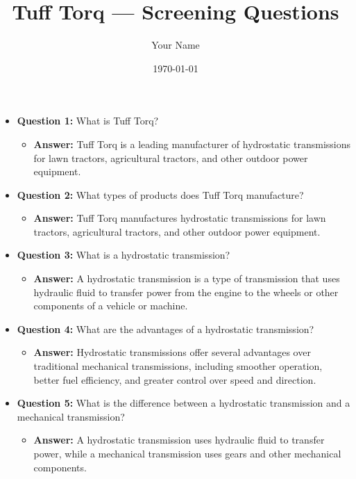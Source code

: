 \documentclass{article}
\begin{document}
\title{Tuff Torq --- Screening Questions}
\author{Your Name}
\date{\today}
\maketitle

\begin{itemize}
    \item \textbf{Question 1:} What is Tuff Torq?
    \begin{itemize}
        \item \textbf{Answer:} Tuff Torq is a leading manufacturer of hydrostatic transmissions for lawn tractors, agricultural tractors, and other outdoor power equipment.
    \end{itemize}
    
    \item \textbf{Question 2:} What types of products does Tuff Torq manufacture?
    \begin{itemize}
        \item \textbf{Answer:} Tuff Torq manufactures hydrostatic transmissions for lawn tractors, agricultural tractors, and other outdoor power equipment.
    \end{itemize}
    
    \item \textbf{Question 3:} What is a hydrostatic transmission?
    \begin{itemize}
        \item \textbf{Answer:} A hydrostatic transmission is a type of transmission that uses hydraulic fluid to transfer power from the engine to the wheels or other components of a vehicle or machine.
    \end{itemize}
    
    \item \textbf{Question 4:} What are the advantages of a hydrostatic transmission?
    \begin{itemize}
        \item \textbf{Answer:} Hydrostatic transmissions offer several advantages over traditional mechanical transmissions, including smoother operation, better fuel efficiency, and greater control over speed and direction.
    \end{itemize}
    
    \item \textbf{Question 5:} What is the difference between a hydrostatic transmission and a mechanical transmission?
    \begin{itemize}
        \item \textbf{Answer:} A hydrostatic transmission uses hydraulic fluid to transfer power, while a mechanical transmission uses gears and other mechanical components.
    \end{itemize}
    

\end{itemize}
\end{document}
